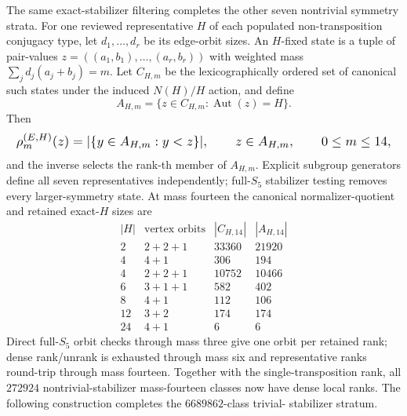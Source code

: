 \documentclass{article}
\newcommand{\fitmath}[1]{\resizebox{0.99\linewidth}{!}{$\displaystyle #1$}}
\begin{document}
The same exact-stabilizer filtering completes the other seven nontrivial
symmetry strata. For one reviewed representative $H$ of each populated
non-transposition conjugacy type, let $d_1,\ldots,d_r$ be its edge-orbit sizes.
An $H$-fixed state is a tuple of pair-values
$z=((a_1,b_1),\ldots,(a_r,b_r))$ with weighted mass
$\sum_j d_j(a_j+b_j)=m$. Let $C_{H,m}$ be the lexicographically ordered set of
canonical such states under the induced $N(H)/H$ action, and define
\[
  A_{H,m}=\{z\in C_{H,m}:\operatorname{Aut}(z)=H\}.
\]
Then
\begin{equation}
  \fitmath{%
    \rho^{(E,H)}_m(z)=|\{y\in A_{H,m}:y<z\}|,
    \qquad z\in A_{H,m},
    \qquad 0\leq m\leq14,
  }
  \label{eq:optimization-crazy-quintuple-s5-remaining-ranking}
\end{equation}
and the inverse selects the rank-th member of $A_{H,m}$. Explicit subgroup
generators define all seven representatives independently; full-$S_5$
stabilizer testing removes every larger-symmetry state. At mass fourteen the
canonical normalizer-quotient and retained exact-$H$ sizes are
\[
\begin{array}{c|c|r|r}
|H| & \text{vertex orbits} & |C_{H,14}| & |A_{H,14}|\\ \hline
2  & 2+2+1 & 33360 & 21920\\
4  & 4+1   & 306   & 194\\
4  & 2+2+1 & 10752 & 10466\\
6  & 3+1+1 & 582   & 402\\
8  & 4+1   & 112   & 106\\
12 & 3+2   & 174   & 174\\
24 & 4+1   & 6     & 6
\end{array}
\]
Direct full-$S_5$ orbit checks through mass three give one orbit per retained
rank; dense rank/unrank is exhausted through mass six and representative ranks
round-trip through mass fourteen. Together with the single-transposition rank,
all $272924$ nontrivial-stabilizer mass-fourteen classes now have dense local
ranks. The following construction completes the $6689862$-class trivial-
stabilizer stratum.
\end{document}
